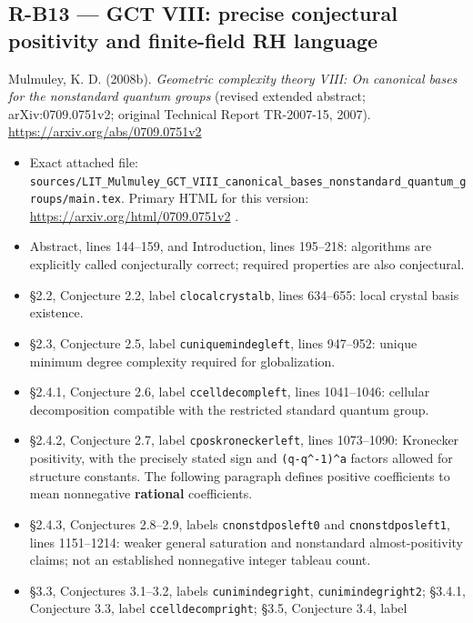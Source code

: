 \documentclass[11pt,a4paper]{article}
\providecommand{\tightlist}{\setlength{\itemsep}{0pt}\setlength{\parskip}{0pt}}
\theoremstyle{definition}\newtheorem{definition}{Definition}
\begin{document}
\subsection{R-B13 --- GCT VIII: precise conjectural positivity and
finite-field RH
language}\label{r-b13--gct-viii-precise-conjectural-positivity-and-finite-field-rh-language}

Mulmuley, K. D. (2008b). \emph{Geometric complexity theory VIII: On
canonical bases for the nonstandard quantum groups} (revised extended
abstract; arXiv:0709.0751v2; original Technical Report TR-2007-15,
2007). \url{https://arxiv.org/abs/0709.0751v2}

\begin{itemize}
\tightlist
\item
  Exact attached file:
  \nolinkurl{sources/LIT_Mulmuley_GCT_VIII_canonical_bases_nonstandard_quantum_groups/main.tex}.
  Primary HTML for this version:
  \url{https://arxiv.org/html/0709.0751v2} .
\item
  Abstract, lines 144--159, and Introduction, lines 195--218: algorithms
  are explicitly called conjecturally correct; required properties are
  also conjectural.
\item
  §2.2, Conjecture 2.2, label \nolinkurl{clocalcrystalb}, lines 634--655:
  local crystal basis existence.
\item
  §2.3, Conjecture 2.5, label \nolinkurl{cuniquemindegleft}, lines
  947--952: unique minimum degree complexity required for globalization.
\item
  §2.4.1, Conjecture 2.6, label \nolinkurl{ccelldecompleft}, lines
  1041--1046: cellular decomposition compatible with the restricted
  standard quantum group.
\item
  §2.4.2, Conjecture 2.7, label \nolinkurl{cposkroneckerleft}, lines
  1073--1090: Kronecker positivity, with the precisely stated sign and
  \texttt{(q-q\^{}-1)\^{}a} factors allowed for structure constants. The
  following paragraph defines positive coefficients to mean nonnegative
  \textbf{rational} coefficients.
\item
  §2.4.3, Conjectures 2.8--2.9, labels \nolinkurl{cnonstdposleft0} and
  \nolinkurl{cnonstdposleft1}, lines 1151--1214: weaker general saturation
  and nonstandard almost-positivity claims; not an established
  nonnegative integer tableau count.
\item
  §3.3, Conjectures 3.1--3.2, labels \nolinkurl{cunimindegright},
  \nolinkurl{cunimindegright2}; §3.4.1, Conjecture 3.3, label
  \nolinkurl{ccelldecompright}; §3.5, Conjecture 3.4, label

\end{itemize}
\end{document}
